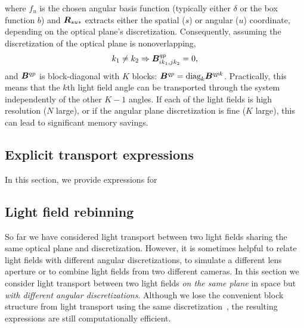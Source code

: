 where $f_u$ is the chosen angular basis function (typically either 
$\delta$ or the box function $b$) and ${\bm{R}}_{su*}$ extracts either the
spatial ($s$) or angular ($u$) coordinate, depending on the optical
plane's discretization.  Consequently, assuming the discretization of the
optical plane is nonoverlapping,
\begin{align}
    k_1 \ne k_2 \Rightarrow {\ensuremath{\bm{B}}}^{qp}_{ik_1, jk_2} = 0,
    \label{eqn,xport,block}
\end{align}
and ${\bm{B}}^{qp}$ is block-diagonal with $K$ blocks: ${\bm{B}}^{qp} = \text{diag}_{k}
{\bm{B}}^{qpk}$.  Practically, this means that the $k$th light field angle can be
transported through the system independently of the other $K-1$ angles. If each
of the light fields is high resolution ($N$ large), or if the angular plane
discretization is fine ($K$ large), this can lead to significant memory savings.

\subsection{Explicit transport expressions}

In this section, we provide expressions for 

\subsection{Light field rebinning}

So far we have considered light transport between two light fields sharing the
same optical plane and discretization.  However, it is sometimes helpful to
relate light fields with different angular discretizations, \eg to simulate a
different lens aperture or to combine light fields from two different cameras.
In this section we consider light transport between two light fields {\it on
the same plane} in space but {\it with different angular discretizations}.
Although we lose the convenient block structure from light transport using the
same discretization~, the resulting expressions are 
still computationally efficient.

